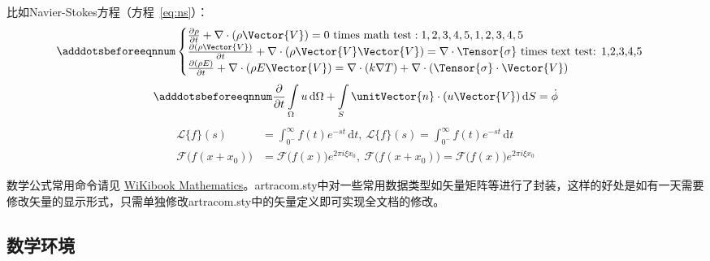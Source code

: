 比如Navier-Stokes方程（方程~\eqref{eq:ns}）：
\begin{equation}
    \label{eq:ns}
    \adddotsbeforeeqnnum%
    \begin{cases}
        \frac{\partial \rho}{\partial t} + \nabla\cdot(\rho\Vector{V}) = 0 \ \mathrm{times\ math\ test: 1,2,3,4,5}, 1,2,3,4,5\\
        \frac{\partial (\rho\Vector{V})}{\partial t} + \nabla\cdot(\rho\Vector{V}\Vector{V}) = \nabla\cdot\Tensor{\sigma} \ \text{times text test: 1,2,3,4,5}\\
        \frac{\partial (\rho E)}{\partial t} + \nabla\cdot(\rho E\Vector{V}) = \nabla\cdot(k\nabla T) + \nabla\cdot(\Tensor{\sigma}\cdot\Vector{V})
    \end{cases}
\end{equation}
\begin{equation}
    \adddotsbeforeeqnnum%
    \frac{\partial }{\partial t}\int\limits_{\Omega} u \, \mathrm{d}\Omega + \int\limits_{S} \unitVector{n}\cdot(u\Vector{V}) \, \mathrm{d}S = \dot{\phi}
\end{equation}
\[
    \begin{split}
        \mathcal{L} \{f\}(s) &= \int _{0^{-}}^{\infty} f(t) e^{-st} \, \mathrm{d}t, \ 
        \mathscr{L} \{f\}(s) = \int _{0^{-}}^{\infty} f(t) e^{-st} \, \mathrm{d}t\\
        \mathcal{F} {\bigl (} f(x+x_{0}) {\bigr )} &= \mathcal{F} {\bigl (} f(x) {\bigr )} e^{2\pi i\xi x_{0}}, \ 
        \mathscr{F} {\bigl (} f(x+x_{0}) {\bigr )} = \mathscr{F} {\bigl (} f(x) {\bigr )} e^{2\pi i\xi x_{0}}
    \end{split}
\]

数学公式常用命令请见 \href{https://en.wikibooks.org/wiki/LaTeX/Mathematics}{WiKibook Mathematics}。artracom.sty中对一些常用数据类型如矢量矩阵等进行了封装，这样的好处是如有一天需要修改矢量的显示形式，只需单独修改artracom.sty中的矢量定义即可实现全文档的修改。

\subsection{数学环境}

